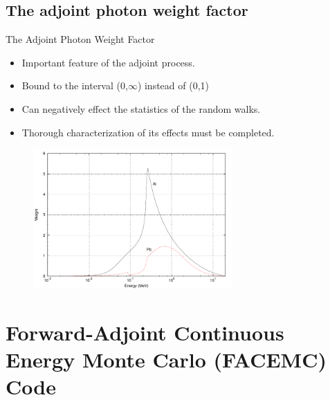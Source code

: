 \documentclass{beamer}
\begin{document}
\subsection{The adjoint photon weight factor}
\begin{frame}{The Adjoint Photon Weight Factor}

  \begin{itemize}
    \item Important feature of the adjoint process.
      \medskip
    \item Bound to the interval (0,$\infty$) instead of (0,1)
      \medskip
    \item Can negatively effect the statistics of the random walks.
      \medskip
    \item Thorough characterization of its effects must be completed.
      \medskip
  \end{itemize}
  
  \begin{figure}[h!]
    \begin{center}
      \includegraphics[width=3.0in]{../document/chapters/photon_interactions/adjoint_weight_factor.pdf}
    \end{center}
  \end{figure}

  
\end{frame}

\section{Forward-Adjoint Continuous Energy Monte Carlo (FACEMC) Code}
\end{document}
